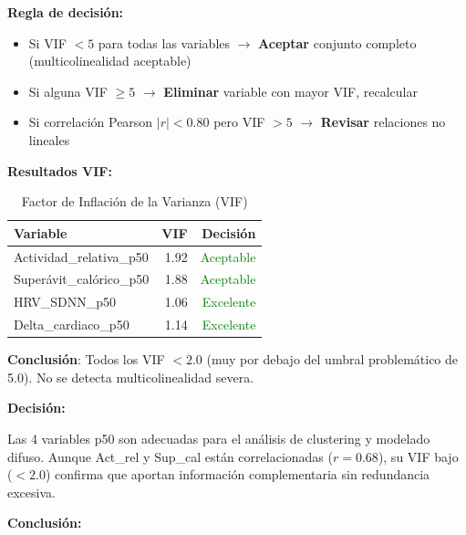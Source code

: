 \documentclass[12pt,letterpaper,twoside]{report}
\begin{document}
\begin{calculobox}
\begin{reglabox}
\textbf{Regla de decisión:}

\begin{itemize}[noitemsep]
    \item Si VIF $< 5$ para todas las variables $\to$ \textbf{Aceptar} conjunto completo (multicolinealidad aceptable)
    \item Si alguna VIF $\geq 5$ $\to$ \textbf{Eliminar} variable con mayor VIF, recalcular
    \item Si correlación Pearson $|r| < 0.80$ pero VIF $> 5$ $\to$ \textbf{Revisar} relaciones no lineales
\end{itemize}
\end{reglabox}

\begin{calculobox}
\textbf{Resultados VIF:}

\begin{table}[H]
\centering
\caption{Factor de Inflación de la Varianza (VIF)}
\label{tab:vif}
\begin{tabular}{@{}lrr@{}}
\toprule
\textbf{Variable} & \textbf{VIF} & \textbf{Decisión} \\
\midrule
Actividad\_relativa\_p50     & 1.92 & \textcolor{green}{Aceptable} \\
Superávit\_calórico\_p50     & 1.88 & \textcolor{green}{Aceptable} \\
HRV\_SDNN\_p50               & 1.06 & \textcolor{green}{Excelente} \\
Delta\_cardiaco\_p50         & 1.14 & \textcolor{green}{Excelente} \\
\bottomrule
\end{tabular}
\end{table}

\textbf{Conclusión}: Todos los VIF $< 2.0$ (muy por debajo del umbral problemático de 5.0). No se detecta multicolinealidad severa.
\end{calculobox}

\begin{decisionbox}
\textbf{Decisión:}

Las 4 variables p50 son adecuadas para el análisis de clustering y modelado difuso. Aunque Act\_rel y Sup\_cal están correlacionadas ($r=0.68$), su VIF bajo ($<2.0$) confirma que aportan información complementaria sin redundancia excesiva.
\end{decisionbox}

\begin{conclusionbox}
\textbf{Conclusión:}


\end{conclusionbox}
\end{calculobox}
\end{document}
